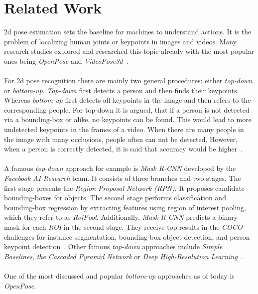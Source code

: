     \section{Related Work}

    2d pose estimation sets the baseline for machines to understand actions.
    It is the problem of localizing human joints or keypoints in images and videos.
    Many research studies explored and researched this topic already with the most popular ones being \textit{OpenPose}
    and \textit{VideoPose3d}~\cite{openpose, videopose3d}.
\\\mbox{}\\
    For 2d pose recognition there are mainly two general procedures: either \textit{top-down} or \textit{bottom-up}.
    \textit{Top-down} first detects a person and then finds their keypoints.
    Whereas \textit{bottom-up} first detects all keypoints in the image and then refers to the corresponding people.
    For top-down it is argued, that if a person is not detected via a bounding-box or alike, no keypoints can be
    found.
    This would lead to more undetected keypoints in the frames of a video.
    When there are many people in the image with many occlusions, people often can not be detected.
    However, when a person is correctly detected, it is said that accuracy would be higher~\cite{synergetic}.
\\\mbox{}\\
    A famous \textit{top-down} approach for example is \textit{Mask R-CNN} developed by the \textit{Facebook AI Research} team. It consists
    of three branches and two stages.
    The first stage presents the \textit{Region Proposal Network (RPN)}. It proposes candidate bounding-boxes for objects.
    The second stage performs classification and bounding-box regression by extracting features using region of
    interest pooling, which they refer to as \textit{RoiPool}.
    Additionally, \textit{Mask R-CNN} predicts a binary mask for each \textit{ROI} in the second stage.
    They receive top results in the \textit{COCO} challenges for instance segmentation, bounding-box object detection, and
    person keypoint detection~\cite{maskrcnn}.
    Other famous \textit{top-down} approaches include \textit{Simple Baselines}, \textit{the Cascaded Pyramid Network} or
    \textit{Deep High-Resolution Learning}~\cite{simplebaselines,pyramidnetwork, highres}.
\\\mbox{}\\
    One of the most discussed and popular \textit{bottom-up} approaches as of today is \textit{OpenPose}.
